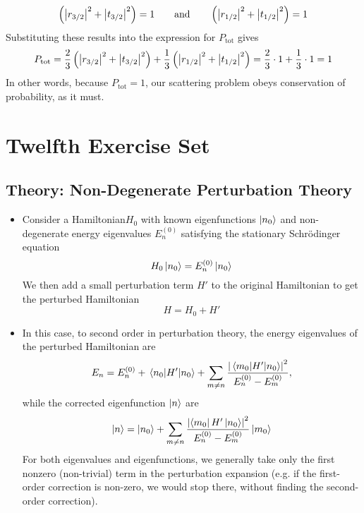 \documentclass[11pt, a4paper]{article}
\newcommand{\eqtext}[1]{\qquad \text{#1} \qquad}
\newcommand{\Schro}{Schr\"{o}dinger\xspace}
\newcommand{\Ham}{Hamiltonian\xspace}
\begin{document}
\begin{itemize}
\begin{equation*}
		 \left(\abs{r_{3/2}}^{2} + \abs{t_{3/2}}^{2}\right) = 1  \eqtext{and}
		 \left(\abs{r_{1/2}}^{2} + \abs{t_{1/2}}^{2}\right) = 1
	\end{equation*}
 	Substituting these results into the expression for $ P_{\text{tot}} $ gives
	\begin{equation*}
		P_{\text{tot}} = \frac{2}{3}\left(\abs{r_{3/2}}^{2} + \abs{t_{3/2}}^{2}\right) + \frac{1}{3}\left(\abs{r_{1/2}}^{2} + \abs{t_{1/2}}^{2}\right) = \frac{2}{3}\cdot 1 +  \frac{1}{3}\cdot 1 = 1
	\end{equation*}
	In other words, because $ P_{\text{tot}} = 1 $, our scattering problem obeys conservation of probability, as it must.


	
\end{itemize}


\section{Twelfth Exercise Set}

\subsection{Theory: Non-Degenerate Perturbation Theory}

\begin{itemize}
	\item Consider a \Ham $ H_{0} $ with known eigenfunctions $ \ket{n_{0}} $ and non-degenerate energy eigenvalues $ E^{(0)}_{n} $ satisfying the stationary \Schro equation
	\begin{equation*}
		H_{0} \ket{n_{0}} = E^{(0)}_{n} \ket{n_{0}} 
	\end{equation*}
	We then add a small perturbation term $ H' $ to the original \Ham to get the perturbed \Ham
	\begin{equation*}
		H = H_{0} + H'
	\end{equation*}
	
	\item In this case, to second order in perturbation theory, the energy eigenvalues of the perturbed Hamiltonian are
	\begin{equation*}
		E_{n} = E^{(0)}_{n} + \mel{n_{0}}{H'}{n_{0}} + \sum_{m\neq n}\frac{\abs{\mel{m_{0}}{H'}{n_{0}}}^{2}}{E^{(0)}_{n}-E^{(0)}_{m}}, 
	\end{equation*}
	while the corrected eigenfunction $ \ket{n} $ are
	\begin{equation*}
		\ket{n} = \ket{n_{0}} + \sum_{m\neq n}\frac{\abs{\bra{m_{0}}H'\ket{n_{0}}}^{2}}{E^{(0)}_{n}-E^{(0)}_{m}} \ket{m_{0}}
	\end{equation*}
	For both eigenvalues and eigenfunctions, we generally take only the first nonzero (non-trivial) term in the perturbation expansion (e.g. if the first-order correction is non-zero, we would stop there, without finding the second-order correction).

\end{itemize}
\end{document}
